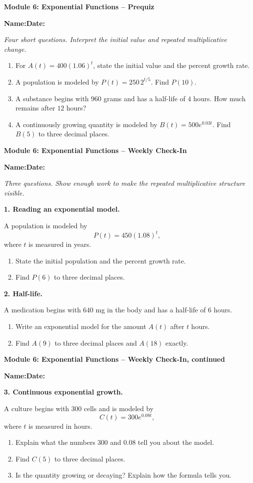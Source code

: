 \documentclass[11pt]{article}
\newcommand{\assessmenttitle}[2]{%
  {\Large\bfseries Module #1: #2}\par\vspace{3pt}
}
\newcommand{\studentline}{%
\noindent\textbf{Name:}\hspace{2.6in}\textbf{Date:}\hspace{1.15in}\par\vspace{7pt}}
\newcommand{\directions}[1]{\textit{#1}\par\vspace{4pt}}
\newcommand{\answerblank}[1]{\vspace{#1}}
\begin{document}
\assessmenttitle{6}{Exponential Functions -- Prequiz}
\studentline
\directions{Four short questions. Interpret the initial value and repeated multiplicative change.}
\begin{enumerate}
\item For $A(t)=400(1.06)^t$, state the initial value and the percent growth rate.
\answerblank{0.48in}
\item A population is modeled by $P(t)=250\,2^{t/5}$. Find $P(10)$.
\answerblank{0.52in}
\item A substance begins with $960$ grams and has a half-life of $4$ hours. How much remains after $12$ hours?
\answerblank{0.58in}
\item A continuously growing quantity is modeled by $B(t)=500e^{0.03t}$. Find $B(5)$ to three decimal places.
\answerblank{0.62in}
\end{enumerate}
\newpage

\assessmenttitle{6}{Exponential Functions -- Weekly Check-In}
\studentline
\directions{Three questions. Show enough work to make the repeated multiplicative structure visible.}
\textbf{1. Reading an exponential model.}

A population is modeled by
\[
P(t)=450(1.08)^t,
\]
where $t$ is measured in years.
\begin{enumerate}[label=(\alph*),leftmargin=0.35in]
\item State the initial population and the percent growth rate.
\answerblank{0.42in}
\item Find $P(6)$ to three decimal places.
\answerblank{0.62in}
\end{enumerate}

\textbf{2. Half-life.}

A medication begins with $640$ mg in the body and has a half-life of $6$ hours.
\begin{enumerate}[label=(\alph*),leftmargin=0.35in]
\item Write an exponential model for the amount $A(t)$ after $t$ hours.
\answerblank{0.48in}
\item Find $A(9)$ to three decimal places and $A(18)$ exactly.
\answerblank{0.75in}
\end{enumerate}
\newpage

\assessmenttitle{6}{Exponential Functions -- Weekly Check-In, continued}
\studentline
\textbf{3. Continuous exponential growth.}

A culture begins with $300$ cells and is modeled by
\[
C(t)=300e^{0.08t},
\]
where $t$ is measured in hours.
\begin{enumerate}[label=(\alph*),leftmargin=0.35in]
\item Explain what the numbers $300$ and $0.08$ tell you about the model.
\answerblank{0.85in}
\item Find $C(5)$ to three decimal places.
\answerblank{0.85in}
\item Is the quantity growing or decaying? Explain how the formula tells you.
\answerblank{0.85in}
\end{enumerate}
\end{document}

